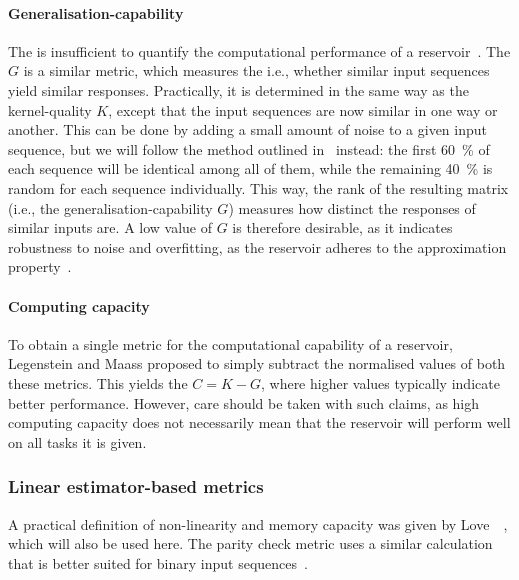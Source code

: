 \paragraph{Generalisation-capability}
The  is insufficient to quantify the computational performance of a reservoir~\cite{WhatMakesPowerful,RC_ASI,IL_Masterproef}.
The  $G$ is a similar metric, which measures the  i.e., whether similar input sequences yield similar responses.
Practically, it is determined in the same way as the kernel-quality $K$, except that the input sequences are now similar in one way or another.
This can be done by adding a small amount of noise to a given input sequence, but we will follow the method outlined in~\cite{RC_ASI} instead: the first \SI{60}{\percent} of each sequence will be identical among all of them, while the remaining \SI{40}{\percent} is random for each sequence individually.
This way, the rank of the resulting matrix (i.e., the generalisation-capability $G$) measures how distinct the responses of similar inputs are.
A low value of $G$ is therefore desirable, as it indicates robustness to noise and overfitting, as the reservoir adheres to the approximation property~\cite{RCbenchmarksReview1}.

\paragraph{Computing capacity}
To obtain a single metric for the computational capability of a reservoir, Legenstein and Maass proposed to simply subtract the normalised values of both these metrics.
This yields the  $C = K - G$, where higher values typically indicate better performance.
However, care should be taken with such claims, as high computing capacity does not necessarily mean that the reservoir will perform well on all tasks it is given.

\subsubsection{Linear estimator-based metrics}
A practical definition of non-linearity and memory capacity was given by Love~\etal~\cite{RC_TaskAgnosticMetrics_v2}, which will also be used here.
The parity check metric uses a similar calculation that is better suited for binary input sequences~\cite{hon2021numerical,tsunegi2019STOforcedsyncRC}.

